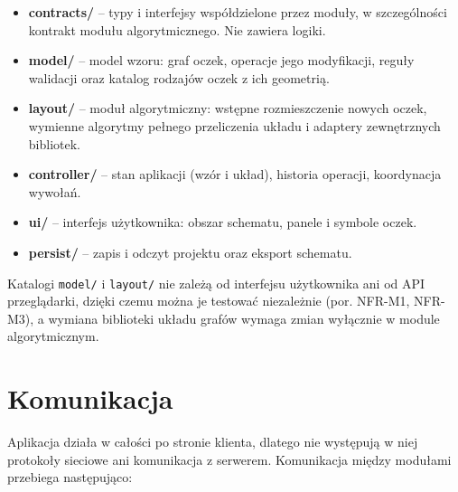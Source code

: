 \documentclass[a4paper,11pt]{article}
\begin{document}
\begin{itemize}
  \item \textbf{contracts/} -- typy i interfejsy współdzielone przez moduły, w szczególności kontrakt modułu algorytmicznego. Nie zawiera logiki.
  \item \textbf{model/} -- model wzoru: graf oczek, operacje jego modyfikacji, reguły walidacji oraz katalog rodzajów oczek z ich geometrią.
  \item \textbf{layout/} -- moduł algorytmiczny: wstępne rozmieszczenie nowych oczek, wymienne algorytmy pełnego przeliczenia układu i adaptery zewnętrznych bibliotek.
  \item \textbf{controller/} -- stan aplikacji (wzór i układ), historia operacji, koordynacja wywołań.
  \item \textbf{ui/} -- interfejs użytkownika: obszar schematu, panele i symbole oczek.
  \item \textbf{persist/} -- zapis i odczyt projektu oraz eksport schematu.
\end{itemize}

Katalogi \texttt{model/} i \texttt{layout/} nie zależą od interfejsu użytkownika ani od API przeglądarki, dzięki czemu można je testować niezależnie (por. NFR-M1, NFR-M3), a wymiana biblioteki układu grafów wymaga zmian wyłącznie w module algorytmicznym.

\pagebreak

\section{Komunikacja}

Aplikacja działa w całości po stronie klienta, dlatego nie występują w niej protokoły sieciowe ani komunikacja z serwerem. Komunikacja między modułami przebiega następująco:
\end{document}
